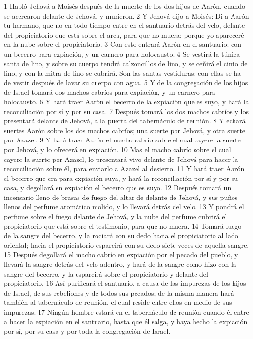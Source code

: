 1 Habló Jehová a Moisés después de la muerte de los dos hijos de Aarón, cuando se acercaron delante de Jehová, y murieron.
2 Y Jehová dijo a Moisés: Di a Aarón tu hermano, que no en todo tiempo entre en el santuario detrás del velo, delante del propiciatorio que está sobre el arca, para que no muera; porque yo apareceré en la nube sobre el propiciatorio.
3 Con esto entrará Aarón en el santuario: con un becerro para expiación, y un carnero para holocausto.
4 Se vestirá la túnica santa de lino, y sobre su cuerpo tendrá calzoncillos de lino, y se ceñirá el cinto de lino, y con la mitra de lino se cubrirá. Son las santas vestiduras; con ellas se ha de vestir después de lavar su cuerpo con agua.
5 Y de la congregación de los hijos de Israel tomará dos machos cabríos para expiación, y un carnero para holocausto.
6 Y hará traer Aarón el becerro de la expiación que es suyo, y hará la reconciliación por sí y por su casa.
7 Después tomará los dos machos cabríos y los presentará delante de Jehová, a la puerta del tabernáculo de reunión.
8 Y echará suertes Aarón sobre los dos machos cabríos; una suerte por Jehová, y otra suerte por Azazel.
9 Y hará traer Aarón el macho cabrío sobre el cual cayere la suerte por Jehová, y lo ofrecerá en expiación.
10 Mas el macho cabrío sobre el cual cayere la suerte por Azazel, lo presentará vivo delante de Jehová para hacer la reconciliación sobre él, para enviarlo a Azazel al desierto.
11 Y hará traer Aarón el becerro que era para expiación suya, y hará la reconciliación por sí y por su casa, y degollará en expiación el becerro que es suyo.
12 Después tomará un incensario lleno de brasas de fuego del altar de delante de Jehová, y sus puños llenos del perfume aromático molido, y lo llevará detrás del velo.
13 Y pondrá el perfume sobre el fuego delante de Jehová, y la nube del perfume cubrirá el propiciatorio que está sobre el testimonio, para que no muera.
14 Tomará luego de la sangre del becerro, y la rociará con su dedo hacia el propiciatorio al lado oriental; hacia el propiciatorio esparcirá con su dedo siete veces de aquella sangre.
15 Después degollará el macho cabrío en expiación por el pecado del pueblo, y llevará la sangre detrás del velo adentro, y hará de la sangre como hizo con la sangre del becerro, y la esparcirá sobre el propiciatorio y delante del propiciatorio.
16 Así purificará el santuario, a causa de las impurezas de los hijos de Israel, de sus rebeliones y de todos sus pecados; de la misma manera hará también al tabernáculo de reunión, el cual reside entre ellos en medio de sus impurezas.
17 Ningún hombre estará en el tabernáculo de reunión cuando él entre a hacer la expiación en el santuario, hasta que él salga, y haya hecho la expiación por sí, por su casa y por toda la congregación de Israel.
